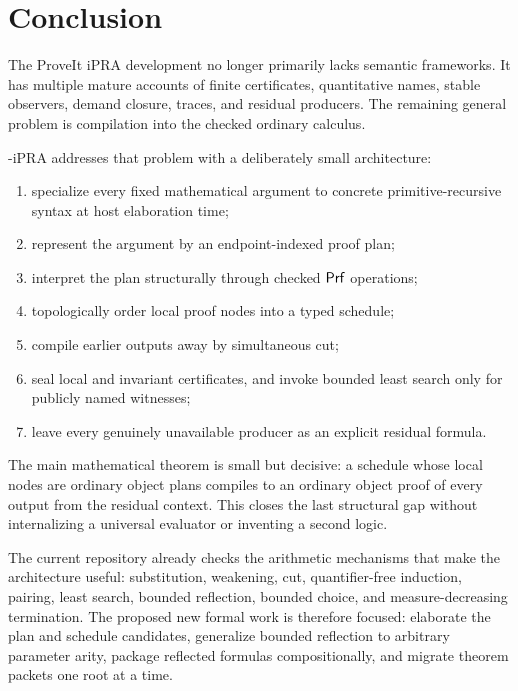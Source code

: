 \section{Conclusion}\label{sec:conclusion}

The ProveIt iPRA development no longer primarily lacks semantic frameworks.  It has multiple mature
accounts of finite certificates, quantitative names, stable observers, demand closure, traces, and
residual producers.  The remaining general problem is compilation into the checked ordinary
calculus.

\TAPIR-iPRA addresses that problem with a deliberately small architecture:

\begin{enumerate}
\item specialize every fixed mathematical argument to concrete primitive-recursive syntax at host
      elaboration time;
\item represent the argument by an endpoint-indexed proof plan;
\item interpret the plan structurally through checked \(\mathsf{Prf}\) operations;
\item topologically order local proof nodes into a typed schedule;
\item compile earlier outputs away by simultaneous cut;
\item seal local and invariant certificates, and invoke bounded least search only for publicly named
      witnesses;
\item leave every genuinely unavailable producer as an explicit residual formula.
\end{enumerate}

The main mathematical theorem is small but decisive: a schedule whose local nodes are ordinary object
plans compiles to an ordinary object proof of every output from the residual context.  This closes the
last structural gap without internalizing a universal evaluator or inventing a second logic.

The current repository already checks the arithmetic mechanisms that make the architecture useful:
substitution, weakening, cut, quantifier-free induction, pairing, least search, bounded reflection,
bounded choice, and measure-decreasing termination.  The proposed new formal work is therefore
focused: elaborate the plan and schedule candidates, generalize bounded reflection to arbitrary
parameter arity, package reflected formulas compositionally, and migrate theorem packets one root at
a time.

